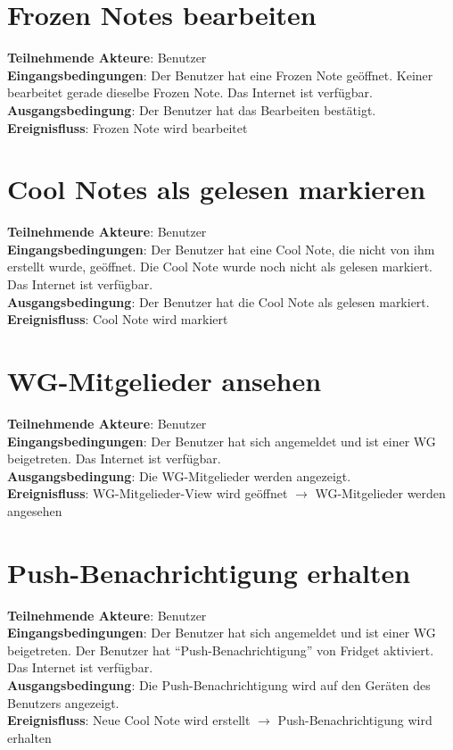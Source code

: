 \documentclass[a4paper]{scrreprt}
\begin{document}
		\section{Frozen Notes bearbeiten}
		\textbf{Teilnehmende Akteure}: Benutzer \\
		\textbf{Eingangsbedingungen}: Der Benutzer hat eine Frozen Note geöffnet. Keiner bearbeitet gerade dieselbe Frozen Note. Das Internet ist verfügbar. \\
		\textbf{Ausgangsbedingung}: Der Benutzer hat das Bearbeiten bestätigt. \\
		\textbf{Ereignisfluss}: Frozen Note wird bearbeitet
		
		\section{Cool Notes als gelesen markieren}
		\textbf{Teilnehmende Akteure}: Benutzer \\
		\textbf{Eingangsbedingungen}: Der Benutzer hat eine Cool Note, die nicht von ihm erstellt wurde, geöffnet. Die Cool Note wurde noch nicht als gelesen markiert. Das Internet ist verfügbar. \\
		\textbf{Ausgangsbedingung}: Der Benutzer hat die Cool Note als gelesen markiert. \\
		\textbf{Ereignisfluss}: Cool Note wird markiert
		
		\section{WG-Mitgelieder ansehen}
		\textbf{Teilnehmende Akteure}: Benutzer \\
		\textbf{Eingangsbedingungen}: Der Benutzer hat sich angemeldet und ist einer WG beigetreten. Das Internet ist verfügbar. \\
		\textbf{Ausgangsbedingung}: Die WG-Mitgelieder werden angezeigt. \\
		\textbf{Ereignisfluss}: WG-Mitgelieder-View wird geöffnet $\rightarrow$ WG-Mitgelieder werden angesehen
		
		\section{Push-Benachrichtigung erhalten}
		\textbf{Teilnehmende Akteure}: Benutzer \\
		\textbf{Eingangsbedingungen}: Der Benutzer hat sich angemeldet und ist einer WG beigetreten. Der Benutzer hat ``Push-Benachrichtigung'' von Fridget aktiviert. Das Internet ist verfügbar. \\
		\textbf{Ausgangsbedingung}: Die Push-Benachrichtigung wird auf den Geräten des Benutzers angezeigt. \\
		\textbf{Ereignisfluss}: Neue Cool Note wird erstellt $\rightarrow$ Push-Benachrichtigung wird erhalten
		
\end{document}
